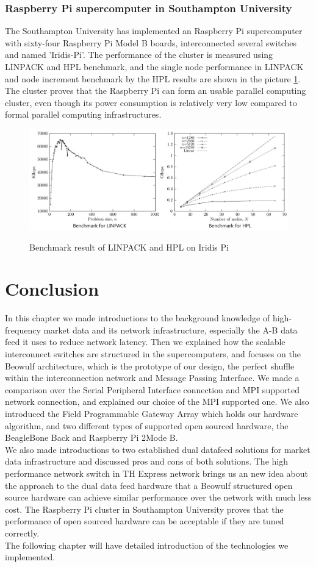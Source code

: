 \documentclass[11pt,openright,a4paper]{report}
\begin{document}
\subsubsection{Raspberry Pi supercomputer in Southampton University}
The Southampton University has implemented an Raspberry Pi supercomputer with sixty-four Raspberry Pi Model B boards, interconnected several switches and named 'Iridis-Pi'\cite{cox2014iridis}. The performance of the cluster is measured using LINPACK and HPL benchmark, and the single node performance in LINPACK and node increment benchmark by the HPL results are shown in the picture \ref{fig:iridisBenchmark}. The cluster proves that the Raspberry Pi can form an usable parallel computing cluster, even though its power consumption is relatively very low compared to formal parallel computing infrastructures.\\
\begin{figure}[H]
\centering
\includegraphics[width=0.7\linewidth]{picture/iridisBenchmark}
\caption{Benchmark result of LINPACK and HPL on Iridis Pi}\cite{cox2014iridis} 
\label{fig:iridisBenchmark}
\end{figure}
\section{Conclusion}
In this chapter we made introductions to the background knowledge of high-frequency market data and its network infrastructure, especially the A-B data feed it uses to reduce network latency. Then we explained how the scalable interconnect switches are structured in the supercomputers, and focuses on the Beowulf architecture, which is the prototype of our design, the perfect shuffle within the interconnection network and Message Passing Interface. We made a comparison over the Serial Peripheral Interface connection and MPI supported network connection, and explained our choice of the MPI supported one. We also introduced the Field Programmable Gateway Array which holds our hardware algorithm, and two different types of supported open sourced hardware, the BeagleBone Back and Raspberry Pi 2Mode B.\\
We also made introductions to two established dual datafeed solutions for market data infrastructure and discussed pros and cons of both solutions. The high performance network switch in TH Express network brings us an new idea about the approach to the dual data feed hardware that a Beowulf structured open source hardware can achieve similar performance over the network with much less cost. The Raspberry Pi cluster in Southampton University proves that the performance of open sourced hardware can be acceptable if they are tuned correctly.\\ 
The following chapter will have detailed introduction of the technologies we implemented.\\ 
\end{document}
